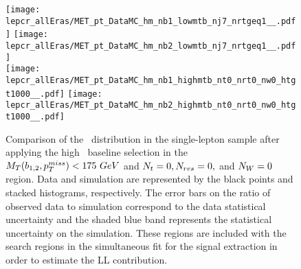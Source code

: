\begin{figure}[!h]
	\begin{center}
  \texttt{[image: lepcr\_allEras/MET\_pt\_DataMC\_hm\_nb1\_lowmtb\_nj7\_nrtgeq1\_\_.pdf]}
  \texttt{[image: lepcr\_allEras/MET\_pt\_DataMC\_hm\_nb2\_lowmtb\_nj7\_nrtgeq1\_\_.pdf]} \\
  \texttt{[image: lepcr\_allEras/MET\_pt\_DataMC\_hm\_nb1\_highmtb\_nt0\_nrt0\_nw0\_htgt1000\_\_.pdf]}
  \texttt{[image: lepcr\_allEras/MET\_pt\_DataMC\_hm\_nb2\_highmtb\_nt0\_nrt0\_nw0\_htgt1000\_\_.pdf]} \\
	\end{center}
	\caption[Lost Lepton HM Control Region]{Comparison of the \met~distribution in the single-lepton sample after applying the high \dm~baseline selection in the $M_{T}(b_{1,2},p_{T}^{miss})<175~GeV$ and $N_{t}=0, N_{res}=0,$ and $N_{W}=0$ region. Data and simulation are represented by the black points and stacked histograms, respectively. The error bars on the ratio of observed data to simulation correspond to the data statistical uncertainty and the shaded blue band represents the statistical uncertainty on the simulation. These regions are included with the search regions in the simultaneous fit for the signal extraction in order to estimate the LL contribution.
	 }
	\label{fig:llb-1lcr-datavsmc-hm-nt0-nrt0-nw0}
\end{figure}

